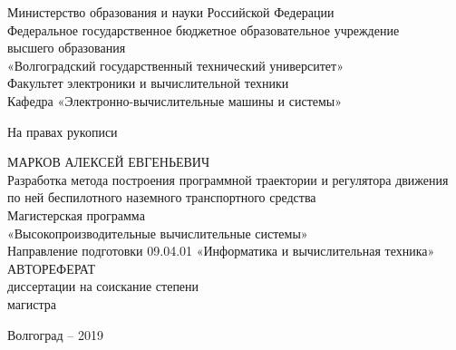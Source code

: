 


\thispagestyle{empty}

\begin{nospasing}
\begin{center}
    Министерство образования и науки Российской Федерации \\
    Федеральное государственное бюджетное образовательное учреждение \\
    высшего образования \\
    «Волгоградский государственный технический университет» \\
    Факультет электроники и вычислительной техники \\
    Кафедра «Электронно-вычислительные машины и системы» \\

    \begin{flushright}
    На правах рукописи \\
    \end{flushright}

    МАРКОВ АЛЕКСЕЙ ЕВГЕНЬЕВИЧ \\
    \vspace{1cm}
    Разработка метода построения программной траектории и регулятора движения по ней беспилотного
    наземного транспортного средства \\
    \vspace{1cm}
    Магистерская программа \\
    «Высокопроизводительные вычислительные системы» \\
    Направление подготовки 09.04.01 «Информатика и вычислительная техника» \\
    \vspace{1cm}
    АВТОРЕФЕРАТ \\
    \vspace{1cm}
    диссертации на соискание степени \\
    магистра \\

    \vfill

    Волгоград – 2019
\end{center}
\end{nospasing}

\newpage

